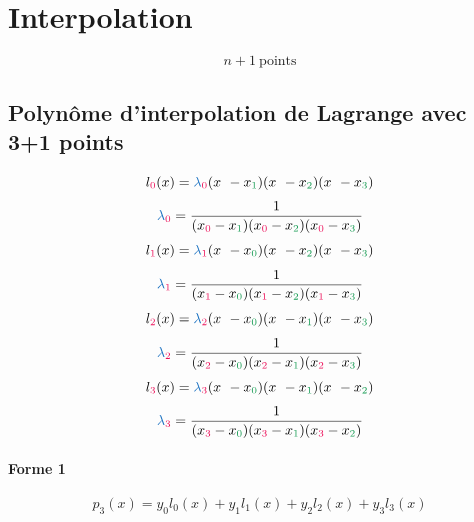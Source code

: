 \documentclass[resume]{subfiles}
\begin{document}
    \section{Interpolation}
    $$\boxed{n+1\ \text{points}}$$
    \subsection{Polynôme d'interpolation de Lagrange avec 3+1 points}
    $$l_{\textcolor{OrangeRed}{0}}(x)=\textcolor{RoyalBlue}{\lambda}_{\textcolor{OrangeRed}{0}}(x_{\ }-x_{\textcolor{ForestGreen}{1}})(x_{\ }-x_{\textcolor{ForestGreen}{2}})(x_{\ }-x_{\textcolor{ForestGreen}{3}})$$
    $$\textcolor{RoyalBlue}{\lambda}_{\textcolor{OrangeRed}{0}}=\frac{1}{(x_{\textcolor{OrangeRed}{0}}-x_{\textcolor{ForestGreen}{1}})(x_{\textcolor{OrangeRed}{0}}-x_{\textcolor{ForestGreen}{2}})(x_{\textcolor{OrangeRed}{0}}-x_{\textcolor{ForestGreen}{3}})}$$
    $$l_{\textcolor{OrangeRed}{1}}(x)=\textcolor{RoyalBlue}{\lambda}_{\textcolor{OrangeRed}{1}}(x_{\ }-x_{\textcolor{ForestGreen}{0}})(x_{\ }-x_{\textcolor{ForestGreen}{2}})(x_{\ }-x_{\textcolor{ForestGreen}{3}})$$
    $$\textcolor{RoyalBlue}{\lambda}_{\textcolor{OrangeRed}{1}}=\frac{1}{(x_{\textcolor{OrangeRed}{1}}-x_{\textcolor{ForestGreen}{0}})(x_{\textcolor{OrangeRed}{1}}-x_{\textcolor{ForestGreen}{2}})(x_{\textcolor{OrangeRed}{1}}-x_{\textcolor{ForestGreen}{3}})}$$
    $$l_{\textcolor{OrangeRed}{2}}(x)=\textcolor{RoyalBlue}{\lambda}_{\textcolor{OrangeRed}{2}}(x_{\ }-x_{\textcolor{ForestGreen}{0}})(x_{\ }-x_{\textcolor{ForestGreen}{1}})(x_{\ }-x_{\textcolor{ForestGreen}{3}})$$
    $$\textcolor{RoyalBlue}{\lambda}_{\textcolor{OrangeRed}{2}}=\frac{1}{(x_{\textcolor{OrangeRed}{2}}-x_{\textcolor{ForestGreen}{0}})(x_{\textcolor{OrangeRed}{2}}-x_{\textcolor{ForestGreen}{1}})(x_{\textcolor{OrangeRed}{2}}-x_{\textcolor{ForestGreen}{3}})}$$
    $$l_{\textcolor{OrangeRed}{3}}(x)=\textcolor{RoyalBlue}{\lambda}_{\textcolor{OrangeRed}{3}}(x_{\ }-x_{\textcolor{ForestGreen}{0}})(x_{\ }-x_{\textcolor{ForestGreen}{1}})(x_{\ }-x_{\textcolor{ForestGreen}{2}})$$
    $$\textcolor{RoyalBlue}{\lambda}_{\textcolor{OrangeRed}{3}}=\frac{1}{(x_{\textcolor{OrangeRed}{3}}-x_{\textcolor{ForestGreen}{0}})(x_{\textcolor{OrangeRed}{3}}-x_{\textcolor{ForestGreen}{1}})(x_{\textcolor{OrangeRed}{3}}-x_{\textcolor{ForestGreen}{2}})}$$
    \paragraph{Forme 1}
    $$p_3(x)=y_0l_0(x)+y_1l_1(x)+y_2l_2(x)+y_3l_3(x)$$
\end{document}
